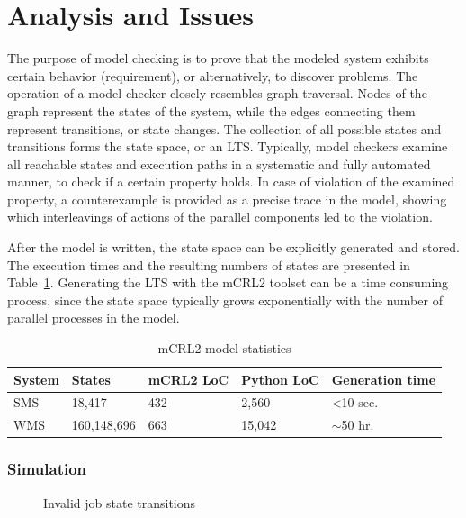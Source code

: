 \documentclass[10pt,conference]{IEEEtran}
\begin{document}
\section{Analysis and Issues}
\label{sec:Section_4}
The purpose of model checking is to prove that the modeled system
exhibits certain behavior (requirement), or alternatively, to discover problems. 
The operation of a model checker closely resembles graph traversal.
Nodes of the graph represent the states of the system, while the edges
connecting them represent transitions, or state changes. The collection of 
all possible states and transitions forms the state space, or an LTS.
Typically, model checkers
examine all reachable states and execution paths in a systematic and 
fully automated manner, to check if a certain property holds.
In case of violation of the examined property, a counterexample is 
provided as a precise trace in the model, showing which interleavings
of actions of the parallel components led to the violation.

After the model is written, the state space can be 
explicitly generated and stored. 
The execution times and the resulting numbers of states are
presented in Table~\ref{mcrl2Stats}.
Generating the LTS with the mCRL2 toolset can be a time consuming process,
since the state space typically grows exponentially with the number of parallel processes in the model.
\begin{table}[h!]
\caption{mCRL2 model statistics}
\label{mcrl2Stats}
  \centering
  \begin{tabular}[0.7\textwidth]{ | p{0.8cm} || l | p{0.8cm} | p{0.7cm} | p{1.2cm} | }
    \hline
  \rowcolor[gray]{0.9}
   System & States & mCRL2 LoC & Python LoC & Generation time \\ \hline\hline
   SMS & 18,417 & 432 & 2,560 & \textless 10 sec. \\ \hline
   WMS & 160,148,696 & 663 & 15,042 & $\sim$50 hr. \\
    \hline
  \end{tabular}
\vspace{-10 pt}
\end{table}
\setcounter{subsubsection}{0}
\subsubsection{Simulation}
\begin{figure}[tp!]
  \centering
  \hfill
  \caption{Invalid job state transitions}
  \label{fig:Simulator-job-trace}
\vspace{-8 pt}
\end{figure}
\end{document}
